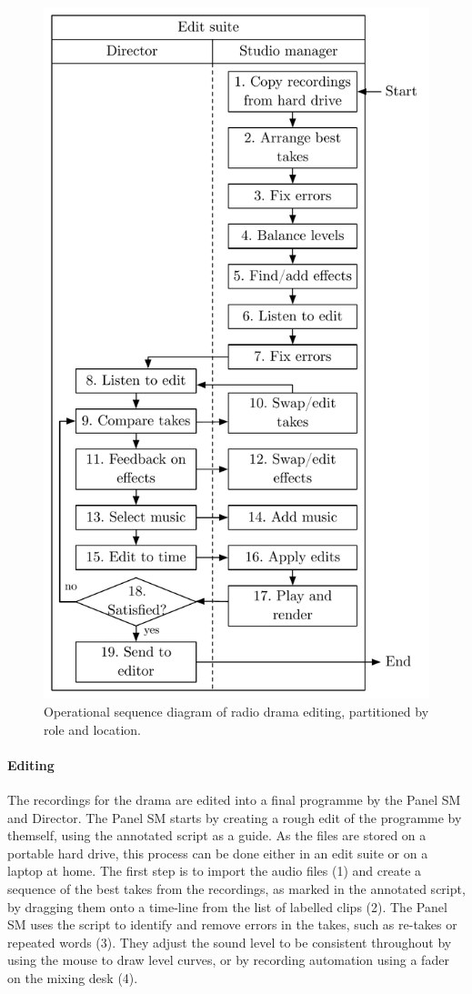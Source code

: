 \begin{figure}
  \centering
  \includegraphics[width=.6\columnwidth]{figs/drama-editing-workflow.pdf}
  \caption{Operational sequence diagram of radio drama editing, partitioned by role and location.}
  \label{fig:ethno-drama-editing}
\end{figure}

\paragraph{Editing}
The recordings for the drama are edited into a final programme by the Panel SM and Director. The Panel SM starts by
creating a rough edit of the programme by themself, using the annotated script as a guide.  As the files are stored on
a portable hard drive, this process can be done either in an edit suite or on a laptop at home. The first step is to
import the audio files (1) and create a sequence of the best takes from the recordings, as marked in the annotated
script, by dragging them onto a time-line from the list of labelled clips (2).  The Panel SM uses the script to
identify and remove errors in the takes, such as re-takes or repeated words (3).  They adjust the sound level to be
consistent throughout by using the mouse to draw level curves, or by recording automation using a fader on the mixing
desk (4).

